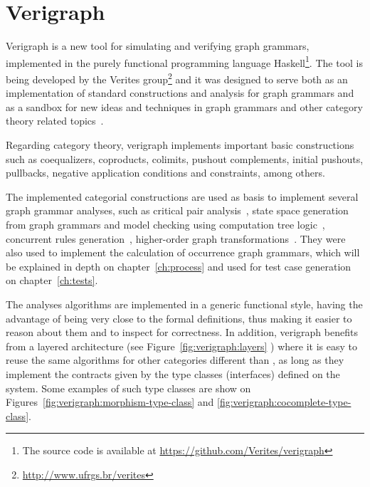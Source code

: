 \chapter{Verigraph}\label{ch:verigraph}

Verigraph is a new tool for simulating and verifying graph grammars, implemented in the purely functional programming language Haskell\footnote{The source code is available at \url{https://github.com/Verites/verigraph}}. The tool is being developed by the Verites group\footnote{\url{http://www.ufrgs.br/verites}} and it was designed to serve both as an implementation of standard constructions and analysis for graph grammars and as a sandbox for new ideas and techniques in graph grammars and other category theory related topics~\cite{BezerraETMF2016,Costa2016,CostaETMF2016, Becker2014}.

Regarding category theory, verigraph implements important basic constructions such as coequalizers, coproducts, colimits, pushout complements, initial pushouts, pullbacks, negative application conditions and constraints, among others.

The implemented categorial constructions are used as basis to implement several graph grammar analyses, such as critical pair analysis~\cite{Lambers2006}, state space generation from graph grammars and model checking using computation tree logic~\cite{Becker2014}, concurrent rules generation~\cite{BezerraETMF2016}, higher-order graph transformations~\cite{Machado2015}. They were also used to implement the calculation of occurrence graph grammars, which will be explained in depth on
chapter~\ref{ch:process} and used for test case generation on chapter~\ref{ch:tests}.

The analyses algorithms are implemented in a generic functional style, having the advantage of being very close to the formal definitions, thus making it easier to reason about them and to inspect for correctness. In addition, verigraph benefits from a layered architecture (see Figure~\ref{fig:verigraph:layers} ) where it is easy to reuse the same algorithms for other categories different than , as long as they implement the contracts given by the type classes (interfaces) defined on the system. Some examples of such type classes are show on
Figures~\ref{fig:verigraph:morphism-type-class} and \ref{fig:verigraph:cocomplete-type-class}.

